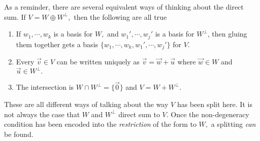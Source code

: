 As a reminder, there are several equivalent ways of thinking about the direct sum. If $V = W \oplus W^\perp,$ then the following are all true \begin{enumerate}
    \item If $w_1, \cdots, w_k$ is a basis for $W,$ and $w_1', \cdots, w_j'$ is a basis for $W^{\perp}$, then gluing them together gets a basis $\{w_1, \cdots, w_k, w_1', \cdots, w_j'\}$ for $V.$
    \item Every $\vec{v} \in V$ can be written uniquely as $\vec{v} = \vec{w} + \vec{u}$ where $\vec{w} \in W$ and $\vec{u} \in W^{\perp}.$
    \item The intersection is $W \cap W^{\perp} = \{\vec{0}\}$ and $V = W + W^{\perp}.$
\end{enumerate}

These are all different ways of talking about the way $V$ has been split here. It is not always the case that $W$ and $W^{\perp}$ direct sum to $V.$ Once the non-degeneracy condition has been encoded into the \emph{restriction} of the form to $W,$ a splitting \emph{can} be found.

\newpage